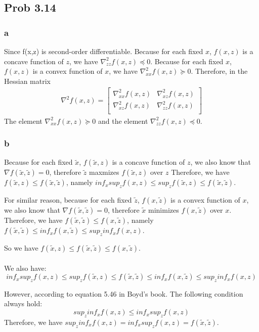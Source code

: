 \documentclass[10pt,a4paper]{article}
\begin{document}
\subsection{Prob 3.14}

\subsubsection{a}
Since f(x,z) is second-order differentiable. Because for each fixed $x$, $f(x,z)$ is a concave function of $z$, we have $\nabla^2_{zz}f(x,z)\preceq0$. Because for each fixed $x$, $f(x,z)$ is a convex function of $x$, we have $\nabla^2_{xx}f(x,z)\succeq0$. 
Therefore, in the Hessian matrix
\begin{align*}
\nabla^2f(x,z)=\begin{bmatrix}
\nabla^2_{xx}f(x,z) & \nabla^2_{xz}f(x,z) \\
\nabla^2_{xz}f(x,z) & \nabla^2_{zz}f(x,z) \\
\end{bmatrix}
\end{align*}
The element $\nabla^2_{xx}f(x,z)\succeq0$ and the element $\nabla^2_{zz}f(x,z) \preceq0$.

\subsubsection{b}
Because for each fixed $\tilde{x}$, $f(\tilde{x},z)$ is a concave function of $z$, we also know that $\nabla f(\tilde{x},\tilde{z})=0$, therefore $\tilde{z}$ maxmizes $f(\tilde{x},z)$ over $z$ Therefore, we have $f(\tilde{x},z)\leq f(\tilde{x},\tilde{z})$, namely $inf_x sup_z f(x,z)\leq sup_zf(\tilde{x},z)\leq f(\tilde{x},\tilde{z})$.

For similar reason, because for each fixed $\tilde{z}$, $f(x,\tilde{z})$ is a convex function of $x$, we also know that $\nabla f(\tilde{x},\tilde{z})=0$, therefore $\tilde{x}$ minimizes $f(x,\tilde{z})$ over $x$. Therefore, we have $f(\tilde{x},\tilde{z})\leq f(x,\tilde{z})$, namely $f(\tilde{x},\tilde{z})\leq inf_x f(x,\tilde{z}) \leq sup_z inf_x f(x,z)$.

So we have $f(\tilde{x},z)\leq f(\tilde{x},\tilde{z})\leq f(x,\tilde{z})$.\\\\
We also have:
$$inf_x sup_z f(x,z)\leq sup_zf(\tilde{x},z)\leq f(\tilde{x},\tilde{z})\leq inf_x f(x,\tilde{z}) \leq sup_z inf_x f(x,z)$$

However, according to equation 5.46 in Boyd's book\cite{boyd2004convex}. The following condition always hold:
$$
sup_z inf_x f(x,z) \leq inf_x sup_z f(x,z)
$$
Therefore, we have $sup_z inf_x f(x,z) = inf_x sup_z f(x,z) = f(\tilde{x},\tilde{z})$.
\end{document}
